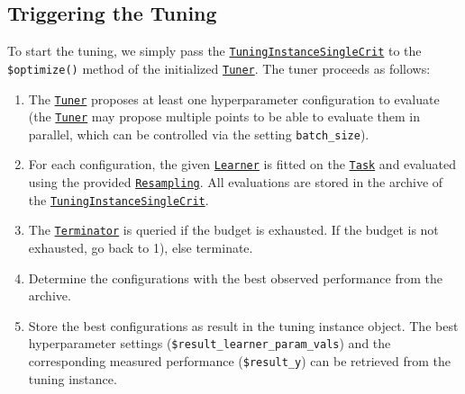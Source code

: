 \documentclass[
]{scrbook}
\newenvironment{Shaded}{\begin{snugshade}}{\end{snugshade}}
\newcommand{\FunctionTok}[1]{\textcolor[rgb]{0.00,0.00,0.00}{#1}}
\newcommand{\NormalTok}[1]{#1}
\newcommand{\SpecialCharTok}[1]{\textcolor[rgb]{0.00,0.00,0.00}{#1}}
\providecommand{\tightlist}{%
  \setlength{\itemsep}{0pt}\setlength{\parskip}{0pt}}
\renewenvironment{Shaded} {\begin{snugshade}\small} {\end{snugshade}}
\begin{document}
\hypertarget{tuning-triggering}{%
\subsection{Triggering the Tuning}\label{tuning-triggering}}

To start the tuning, we simply pass the \href{https://mlr3tuning.mlr-org.com/reference/TuningInstanceSingleCrit.html}{\texttt{TuningInstanceSingleCrit}} to the \texttt{\$optimize()} method of the initialized \href{https://mlr3tuning.mlr-org.com/reference/Tuner.html}{\texttt{Tuner}}.
The tuner proceeds as follows:

\begin{enumerate}
\def\labelenumi{\arabic{enumi}.}
\tightlist
\item
  The \href{https://mlr3tuning.mlr-org.com/reference/Tuner.html}{\texttt{Tuner}} proposes at least one hyperparameter configuration to evaluate (the \href{https://mlr3tuning.mlr-org.com/reference/Tuner.html}{\texttt{Tuner}} may propose multiple points to be able to evaluate them in parallel, which can be controlled via the setting \texttt{batch\_size}).
\item
  For each configuration, the given \href{https://mlr3.mlr-org.com/reference/Learner.html}{\texttt{Learner}} is fitted on the \href{https://mlr3.mlr-org.com/reference/Task.html}{\texttt{Task}} and evaluated using the provided \href{https://mlr3.mlr-org.com/reference/Resampling.html}{\texttt{Resampling}}.
  All evaluations are stored in the archive of the \href{https://mlr3tuning.mlr-org.com/reference/TuningInstanceSingleCrit.html}{\texttt{TuningInstanceSingleCrit}}.
\item
  The \href{https://bbotk.mlr-org.com/reference/Terminator.html}{\texttt{Terminator}} is queried if the budget is exhausted.
  If the budget is not exhausted, go back to 1), else terminate.
\item
  Determine the configurations with the best observed performance from the archive.
\item
  Store the best configurations as result in the tuning instance object.
  The best hyperparameter settings (\texttt{\$result\_learner\_param\_vals}) and the corresponding measured performance (\texttt{\$result\_y}) can be retrieved from the tuning instance.
\end{enumerate}

\begin{Shaded}
\end{Shaded}
\end{document}
